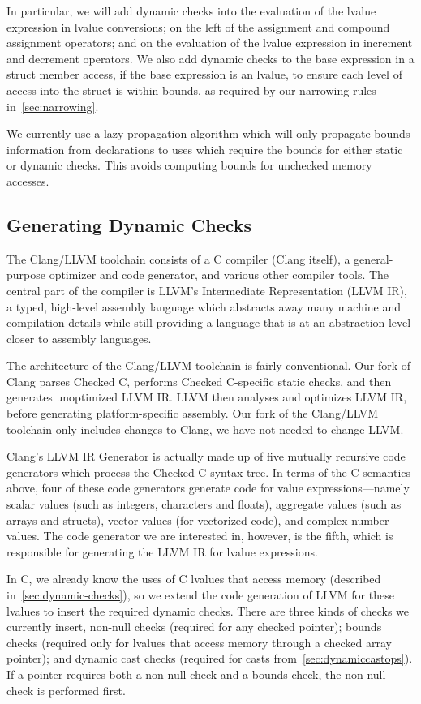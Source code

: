 In particular, we will add dynamic checks into the evaluation of the
lvalue expression in lvalue conversions; on the left of the assignment
and compound assignment operators; and on the evaluation of the lvalue
expression in increment and decrement operators. We also add dynamic checks to
the base expression in a struct member access, if the base expression
is an lvalue, to ensure each level of access into the struct is within
bounds, as required by our narrowing rules in~\autoref{sec:narrowing}.

We currently use a lazy propagation algorithm which will only
propagate bounds information from declarations to uses which require
the bounds for either static or dynamic checks. This avoids computing
bounds for unchecked memory accesses.

\subsection{Generating Dynamic Checks}
\label{sec:dynamic-checks-impl}

The Clang/LLVM toolchain consists of a C compiler (Clang itself), a
general-purpose optimizer and code generator, and various other
compiler tools. The central part of the compiler is LLVM's
Intermediate Representation (LLVM IR), a typed, high-level assembly
language which abstracts away many machine and compilation details
while still providing a language that is at an abstraction level
closer to  assembly languages.

The architecture of the Clang/LLVM toolchain is fairly conventional.
Our fork of Clang parses Checked C, performs Checked C-specific static
checks, and then generates unoptimized LLVM IR. LLVM then analyses and
optimizes LLVM IR, before generating platform-specific assembly. Our
fork of the Clang/LLVM toolchain only includes changes to Clang, we
have not needed to change LLVM.

Clang's LLVM IR Generator is actually made up of five mutually
recursive code generators which process the Checked C syntax tree. In
terms of the C semantics above, four of these code generators generate
code for value expressions---namely scalar values (such as integers,
characters and floats), aggregate values (such as arrays and structs),
vector values (for vectorized code), and complex number values. The
code generator we are interested in, however, is the fifth, which is
responsible for generating the LLVM IR for lvalue expressions.

In C, we already know the uses of C lvalues that access memory
(described in~\autoref{sec:dynamic-checks}), so we extend the code
generation of LLVM for these lvalues to insert the required dynamic
checks. There are three kinds of checks we currently insert, non-null
checks (required for any checked pointer); bounds checks (required
only for lvalues that access memory through a checked array pointer);
and dynamic cast checks (required for casts
from~\autoref{sec:dynamiccastops}). If a pointer requires both a
non-null check and a bounds check, the non-null check is performed
first.

